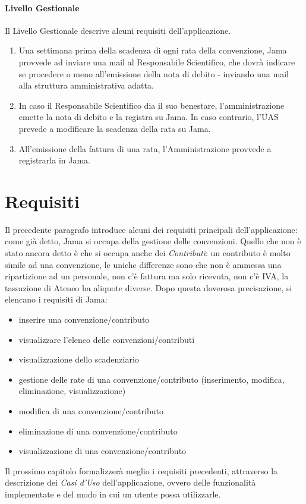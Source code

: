 \paragraph{Livello Gestionale}
Il Livello Gestionale descrive alcuni requisiti dell'applicazione.\newline
\begin{enumerate}
\item Una settimana prima della scadenza di ogni rata della convenzione, Jama provvede ad inviare una mail al Responsabile Scientifico, che dovrà indicare se procedere o meno all'emissione della nota di debito - inviando una mail alla struttura amministrativa adatta.
\item In caso il Responsabile Scientifico dia il suo benestare, l'amministrazione emette la nota di debito e la registra su Jama. In caso contrario, l'UAS prevede a modificare la scadenza della rata su Jama.
\item All'emissione della fattura di una rata, l'Amministrazione provvede a registrarla in Jama.\newline
\end{enumerate}

\section{Requisiti}

Il precedente paragrafo introduce alcuni dei requisiti principali dell'applicazione: come già detto, Jama si occupa della gestione delle convenzioni. Quello che non è stato ancora detto è che si occupa anche dei \textsl{Contributi}: un contributo è molto simile ad una convenzione, le uniche differenze sono che non è ammessa una ripartizione ad un personale, non c'è fattura ma solo ricevuta, non c'è IVA, la tassazione di Ateneo ha aliquote diverse.\newline
Dopo questa doverosa precisazione, si elencano i requisiti di Jama:

\begin{itemize}
\item inserire una convenzione/contributo
\item visualizzare l'elenco delle convenzioni/contributi
\item visualizzazione dello scadenziario
\item gestione delle rate di una convenzione/contributo (inserimento, modifica, eliminazione, visualizzazione)
\item modifica di una convenzione/contributo
\item eliminazione di una convenzione/contributo
\item visualizzazione di una convenzione/contributo\newline
\end{itemize}
Il prossimo capitolo formalizzerà meglio i requisiti precedenti, attraverso la descrizione dei \textsl{Casi d'Uso} dell'applicazione, ovvero delle funzionalità implementate e del modo in cui un utente possa utilizzarle.

